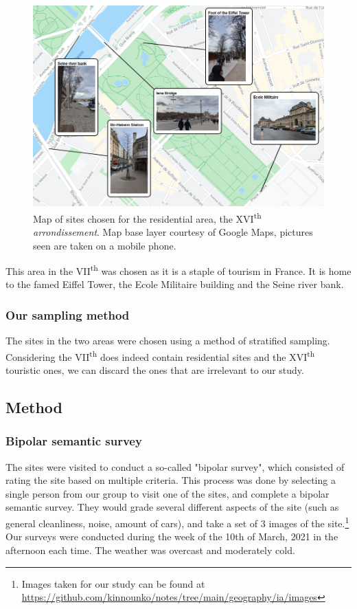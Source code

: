 \documentclass[11pt,letterpaper]{article}
\begin{document}
\begin{figure}[H]
    \begin{minipage}{\textwidth}
        \centering
        \includegraphics[width=0.7\linewidth]{media/7esites.png}
        \caption{Map of sites chosen for the residential area, the XVI\textsuperscript{th} \textit{arrondissement}. Map base layer courtesy of Google Maps, pictures seen are taken on a mobile phone.}
    \end{minipage}
\end{figure}

This area in the VII\textsuperscript{th} was chosen as it is a staple of tourism in France. It is home to the famed Eiffel Tower, the Ecole Militaire building and the Seine river bank.

\subsubsection{Our sampling method}

The sites in the two areas were chosen using a method of stratified sampling. Considering the VII\textsuperscript{th} does indeed contain residential sites and the XVI\textsuperscript{th} touristic ones, we can discard the ones that are irrelevant to our study.

\subsection{Method}

\subsubsection{Bipolar semantic survey}

The sites were visited to conduct a so-called "bipolar survey", which consisted of rating the site based on multiple criteria. This process was done by selecting a single person from our group to visit one of the sites, and complete a bipolar semantic survey. They would grade several different aspects of the site (such as general cleanliness, noise, amount of cars), and take a set of 3 images of the site.\footnote{Images taken for our study can be found at \url{https://github.com/kinnounko/notes/tree/main/geography/ia/images}} Our surveys were conducted during the week of the 10th of March, 2021 in the afternoon each time. The weather was overcast and moderately cold.
\end{document}
